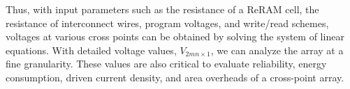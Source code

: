 Thus, with input parameters such as the resistance of a ReRAM cell, the
resistance of interconnect wires, program voltages, and write/read
schemes, voltages at various cross points can be obtained by solving
the system of linear equations. With detailed voltage values,
$V_{2mn{\times}1}$, we can analyze the array at a fine granularity. These
values are also critical to evaluate reliability, energy consumption,
driven current density, and area overheads of a cross-point array.
